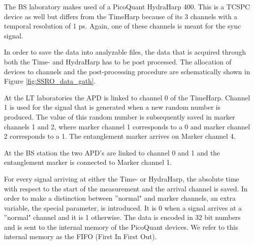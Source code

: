 The BS laboratory makes used of a PicoQuant HydraHarp 400. This is a TCSPC device as well but differs from the TimeHarp because of its 3 channels with a temporal resolution of 1 ps. Again, one of these channels is meant for the sync signal. 

In order to save the data into analyzable files, the data that is acquired through both the Time- and HydraHarp has to be post processed. The allocation of devices to channels and the post-processing procedure are schematically shown in Figure \ref{fig:SSRO_data_gath}.

At the LT laboratories the APD is linked to channel 0 of the TimeHarp. Channel 1 is used for the signal that is generated  when a new random number is produced. The value of this random number is subsequently saved in marker channels 1 and 2, where marker channel 1 corresponds to a 0 and marker channel 2 corresponds to a 1. The entanglement marker arrives on Marker channel 4. 

At the BS station the two APD's are linked to channel 0 and 1 and the entanglement marker is connected to Marker channel 1. 

For every signal arriving at either the Time- or HydraHarp, the absolute time with respect to the start of the measurement and the arrival channel is saved. In order to make a distinction between ''normal" and marker channels, an extra variable, the special parameter, is introduced. It is 0 when a signal arrives at a ''normal" channel and it is 1 otherwise. The data is encoded in 32 bit numbers and is sent to the internal memory of the PicoQuant devices. We refer to this internal memory as the FIFO (First In First Out). 

